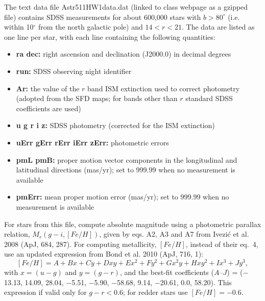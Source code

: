 The text data file Astr511HW1data.dat (linked to class webpage as
a gzipped file) contains SDSS measurements for 
about 600,000 stars with $b>80^\circ$ (i.e. within 10$^\circ$ 
from the north galactic pole) and $14<r<21$. The data are listed as one line
per star, with each line containing the following quantities:
\begin{itemize}
\item {\bf ra dec:} right ascension and declination (J2000.0)
 in decimal degrees 
\item {\bf run:} SDSS observing night identifier
\item {\bf Ar:} the value of the $r$ band ISM extinction used to 
     correct photometry (adopted from the SFD maps; for bands 
     other than $r$ standard SDSS coefficients are used)
\item {\bf u g r i z:} SDSS photometry (corrected for the ISM
       extinction)
\item {\bf uErr gErr rErr iErr zErr:} photometric errors
\item {\bf pmL pmB:} proper motion vector components in the
      longitudinal and latitudinal directions (mas/yr); set to
      999.99 when no measurement is available 
\item {\bf pmErr:} mean proper motion error (mas/yr); set to
      999.99 when no measurement is available 
\end{itemize}

For stars from this file, compute absolute magnitude using
a photometric parallax relation, $M_r(g-i,[Fe/H])$, given
by eqs. A2, A3 and A7 from Ivezi\'{c} et al. 2008 (ApJ, 684, 287).
For computing metallicity, $[Fe/H]$, instead of their
eq.~4, use an updated expression from Bond et al. 2010 (ApJ, 716, 1): 
\begin{equation}
\label{Zphotom}
  [Fe/H] = A + Bx + Cy + Dxy  + Ex^2 + Fy^2 + Gx^2 y + Hxy^2 + Ix^3 + Jy^3,
\end{equation}
with $x=(u-g)$ and $y=(g-r)$, and the best-fit coefficients ($A$--$J$) = 
($-$13.13, 14.09, 28.04, $-$5.51, $-$5.90, $-$58.68, 9.14, $-$20.61, 0.0,
58.20). This expression if valid only for $g-r<0.6$; for redder stars
use $[Fe/H]=-0.6$. 

